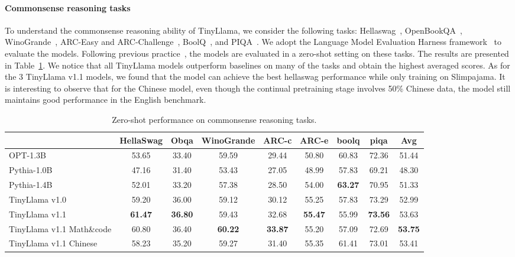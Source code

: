 \documentclass{article}
\begin{document}
\vspace{-0.5em}
\paragraph{Commonsense reasoning tasks} To understand the commonsense reasoning ability of TinyLlama,
we consider the following tasks: Hellaswag~\citep{zellers2019hellaswag}, 
OpenBookQA~\citep{mihaylov2018obqa}, 
WinoGrande~\citep{sakaguchi2021winogrande}, 
ARC-Easy and ARC-Challenge~\citep{clark2018arc}, 
BoolQ~\citep{clark2019boolq}, 
and PIQA~\citep{bisk2020piqa}.
%
We adopt the Language Model Evaluation Harness framework~\citep{evalharness} to evaluate the models.
%
Following previous practice~\citep{biderman2023pythia}, the models are evaluated in a zero-shot setting on these tasks.
%
The results are presented in Table~\ref{tab:pretrained_res}.
%
We notice that all TinyLlama models outperform baselines on many of the tasks and obtain the highest averaged scores.
As for the 3 TinyLlama v1.1 models, we found that the model can achieve the best hellaswag performance while only training on Slimpajama.
It is interesting to observe that for the Chinese model, even though the continual pretraining stage involves 50\% Chinese data, the model still maintains good performance in the English benchmark.


\begin{table}[htbp]
  \centering
  \scriptsize
  \caption{ 
    Zero-shot performance on commonsense reasoning tasks.
  }
  \begin{tabular}{lcccccccc}
    \toprule
    & \textbf{HellaSwag}	& \textbf{Obqa} &	\textbf{WinoGrande}	& \textbf{ARC-c}	& \textbf{ARC-e}	& \textbf{boolq}	& \textbf{piqa} & \textbf{Avg} \\

    \midrule    
    OPT-1.3B\xspace      &  53.65	&33.40	& 59.59&	29.44	&50.80	&60.83	&72.36	& 51.44\\
    Pythia-1.0B\xspace      &  47.16	&31.40	&53.43&	27.05	&48.99	&57.83	&69.21	&48.30\\
    Pythia-1.4B\xspace      &  52.01	&33.20	&57.38&	28.50	& 54.00	&\textbf{63.27}	&70.95	&51.33\\
    \midrule
    TinyLlama v1.0\xspace      &  59.20	 & 36.00&	59.12&	30.12 & 55.25&	57.83	& 73.29	& 52.99  \\
    TinyLlama v1.1\xspace      &  \textbf{61.47}	&\textbf{36.80}&	59.43&	32.68&\textbf{55.47}&	55.99	&\textbf{73.56}	& 53.63  \\
    TinyLlama v1.1 Math\&code\xspace    &  60.80 &  36.40 &  \textbf{60.22} &  \textbf{33.87} & 55.20 & 57.09 & 72.69 &  \textbf{53.75} \\
    TinyLlama v1.1 Chinese\xspace     &  58.23 &  35.20 &  59.27 &  31.40 & 55.35 & 61.41 & 73.01 &  53.41 \\
    
    \bottomrule
  \end{tabular}
  \label{tab:pretrained_res}
  \vspace{-0.5em}
\end{table}
\vspace{-0.5em}
\end{document}

